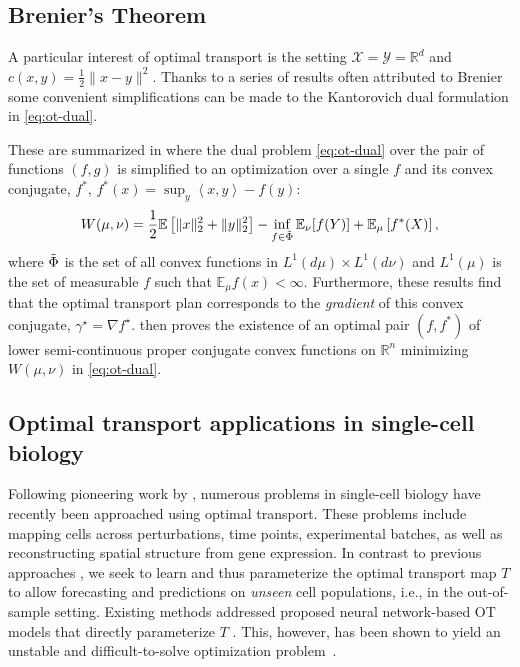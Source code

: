 \subsection{Brenier's Theorem}
A particular interest of optimal transport is the setting $\mathcal{X} = \mathcal{Y} = \mathbb{R}^d$ and $c(x, y) = \frac{1}{2} \| x - y \|^2$.
Thanks to a series of results often attributed to Brenier \cite{knott1984,brenier1991}
some convenient simplifications can be made to the Kantorovich dual formulation in \eqref{eq:ot-dual}.

These are summarized in \citet[Theorem 2.9]{villani2003} where the dual problem \ref{eq:ot-dual} over the pair of functions $(f, g)$ is simplified to
an optimization over a single $f$ and its convex conjugate, $f^*$, $f^*(x) = \sup_y \left<x,y\right> - f(y)$:
\begin{equation} \label{eq:ot-dual-brenier}
    W(\mu, \nu)= \frac{1}{2}\mathbb{E}\left[\|x\|_{2}^{2}+\|y\|_{2}^{2}\right]-\inf _{f \in \Tilde{\Phi}} \mathbb{E}_{\nu}[f(Y)]+\mathbb{E}_{\mu}\left[f^{*}(X)\right],
\end{equation}
where $\Tilde{\Phi}$ is the set of all convex functions in $L^1(d\mu) \times L^1(d\nu)$ and
$L^{1}(\mu)$ is the set of measurable $f$ such that $\mathbb{E}_\mu f(x) < \infty$.
Furthermore, these results find that the optimal transport plan corresponds to the \emph{gradient} of this convex conjugate, $\gamma^\star = \nabla f^\star$.
\citet[Theorem 2.9]{villani2003} then proves the existence of an optimal pair $(f, f^*)$ of lower semi-continuous proper conjugate convex functions on $\mathbb{R}^n$ minimizing $W(\mu, \nu)$ in \eqref{eq:ot-dual}.

\subsection{Optimal transport applications in single-cell biology}
Following pioneering work by \citet{schiebinger2019}, numerous problems in single-cell biology have recently been approached using optimal transport.
These problems include mapping cells across perturbations, time points, experimental batches, as well as reconstructing spatial structure from gene expression.
In contrast to previous approaches \citep{schiebinger2019, lavenant2023},
we seek to learn and thus parameterize the optimal transport map $T$ to allow forecasting and predictions on \emph{unseen} cell populations,
i.e., in the out-of-sample setting.
Existing methods addressed proposed neural network-based OT models that directly parameterize $T$ \citep{leygonie2019, yang2019, prasad2022}.
This, however, has been shown to yield an unstable and difficult-to-solve optimization problem~\citep[Table 1]{makkuva2020}.

